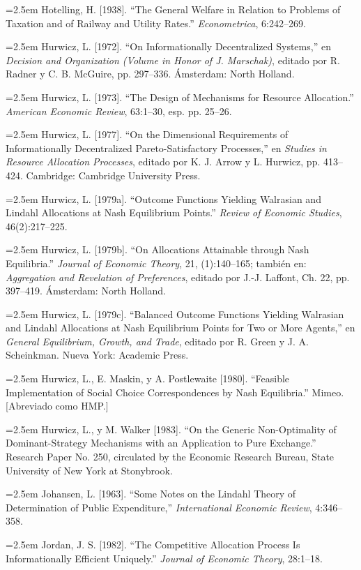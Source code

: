 \documentclass[12pt, letterpaper]{article}
\newcommand{\bibentry}[1]{\noindent\hangindent=2.5em\hangafter=1 \small #1 \par\vspace{0.75em}}
\begin{document}
\bibentry{Hotelling, H. [1938]. ``The General Welfare in Relation to Problems of Taxation and of Railway and Utility Rates.'' \textit{Econometrica}, 6:242--269.}

\bibentry{Hurwicz, L. [1972]. ``On Informationally Decentralized Systems,'' en \textit{Decision and Organization (Volume in Honor of J. Marschak)}, editado por R. Radner y C. B. McGuire, pp. 297--336. Ámsterdam: North Holland.}

\bibentry{Hurwicz, L. [1973]. ``The Design of Mechanisms for Resource Allocation.'' \textit{American Economic Review}, 63:1--30, esp. pp. 25--26.}

\bibentry{Hurwicz, L. [1977]. ``On the Dimensional Requirements of Informationally Decentralized Pareto-Satisfactory Processes,'' en \textit{Studies in Resource Allocation Processes}, editado por K. J. Arrow y L. Hurwicz, pp. 413--424. Cambridge: Cambridge University Press.}

\bibentry{Hurwicz, L. [1979a]. ``Outcome Functions Yielding Walrasian and Lindahl Allocations at Nash Equilibrium Points.'' \textit{Review of Economic Studies}, 46(2):217--225.}

\bibentry{Hurwicz, L. [1979b]. ``On Allocations Attainable through Nash Equilibria.'' \textit{Journal of Economic Theory}, 21, (1):140--165; también en: \textit{Aggregation and Revelation of Preferences}, editado por J.-J. Laffont, Ch. 22, pp. 397--419. Ámsterdam: North Holland.}

\bibentry{Hurwicz, L. [1979c]. ``Balanced Outcome Functions Yielding Walrasian and Lindahl Allocations at Nash Equilibrium Points for Two or More Agents,'' en \textit{General Equilibrium, Growth, and Trade}, editado por R. Green y J. A. Scheinkman. Nueva York: Academic Press.}

\bibentry{Hurwicz, L., E. Maskin, y A. Postlewaite [1980]. ``Feasible Implementation of Social Choice Correspondences by Nash Equilibria.'' Mimeo. [Abreviado como HMP.]}

\bibentry{Hurwicz, L., y M. Walker [1983]. ``On the Generic Non-Optimality of Dominant-Strategy Mechanisms with an Application to Pure Exchange.'' Research Paper No. 250, circulated by the Economic Research Bureau, State University of New York at Stonybrook.}

\bibentry{Johansen, L. [1963]. ``Some Notes on the Lindahl Theory of Determination of Public Expenditure,'' \textit{International Economic Review}, 4:346--358.}

\bibentry{Jordan, J. S. [1982]. ``The Competitive Allocation Process Is Informationally Efficient Uniquely.'' \textit{Journal of Economic Theory}, 28:1--18.}
\end{document}
